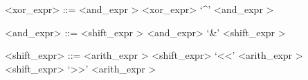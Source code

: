 \label{xorzzzexprb}

\begin{grammar}
<xor_expr> ::= <and_expr \myref[andzzzexprb]>
	\alt <xor_expr> `^' <and_expr \myref[andzzzexprb]>
\end{grammar}


\label{andzzzexprb}

\begin{grammar}
<and_expr> ::= <shift_expr \myref[shiftzzzexprb]>
	\alt <and_expr> `&' <shift_expr \myref[shiftzzzexprb]>
\end{grammar}


\label{shiftzzzexprb}

\begin{grammar}
<shift_expr> ::= <arith_expr \myref[arithzzzexprb]>
	\alt <shift_expr> `<<' <arith_expr \myref[arithzzzexprb]>
	\alt <shift_expr> `>>' <arith_expr \myref[arithzzzexprb]>
\end{grammar}


